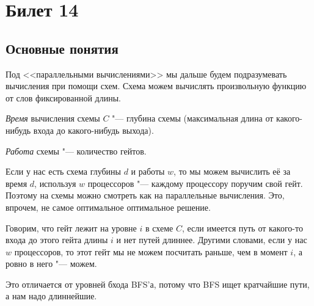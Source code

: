 \setcounter{section}{13}
\section{Билет 14}
\subsection{Основные понятия}
	Под <<параллельными вычислениями>> мы дальше будем подразумевать вычисления при помощи схем.
	Схема можем вычислять произвольную функцию от слов фиксированной длины.

	\begin{Def}
		\textit{Время} вычисления схемы $C$ "--- глубина схемы (максимальная длина от какого-нибудь входа до какого-нибудь выхода).
	\end{Def}
	\begin{Def}
		\textit{Работа} схемы "--- количество гейтов.
	\end{Def}
	\begin{Rem}
		Если у нас есть схема глубины $d$ и работы $w$, то мы можем вычислить её за время $d$, используя $w$ процессоров "--- каждому процессору поручим свой гейт.
		Поэтому на схемы можно смотреть как на параллельные вычисления.
		Это, впрочем, не самое оптимальное оптимальное решение.
	\end{Rem}

	\begin{Def}
		Говорим, что гейт лежит на уровне $i$ в схеме $C$, если имеется путь от какого-то входа до этого гейта длины $i$ и нет путей длиннее.
		Другими словами, если у нас $w$ процессоров, то этот гейт мы не можем посчитать раньше, чем в момент $i$, а ровно в него "--- можем.
	\end{Def}
	\begin{Rem}
		Это отличается от уровней бхода BFS'а, потому что BFS ищет кратчайшие пути, а нам надо длиннейшие.
	\end{Rem}

